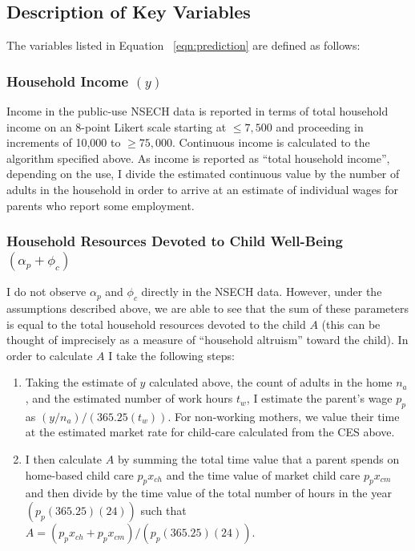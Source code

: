 \documentclass[1p, review]{elsarticle}\usepackage[]{graphicx}\usepackage[]{color}
\begin{document}
\subsection{Description of Key Variables}










The variables listed in Equation ~\ref{eqn:prediction} are defined as follows:

\subsubsection{Household Income $(y)$}

Income in the public-use NSECH data is reported in terms of total household income on an 8-point Likert scale starting at $\le 7,500$ and proceeding in increments of 10,000 to $\ge 75,000$. Continuous income is calculated to the algorithm specified above. As income is reported as ``total household income'', depending on the use, I divide the estimated continuous value by the number of adults in the household in order to arrive at an estimate of individual wages for parents who report some employment.    

\subsubsection{Household Resources Devoted to Child Well-Being $(\alpha_p + \phi_c)$}

I do not observe $\alpha_p$ and $\phi_c$ directly in the NSECH data. However, under the assumptions described above, we are able to see that the sum of these parameters is equal to the total household resources devoted to the child $A$ (this can be thought of imprecisely as a measure of ``household altruism'' toward the child). In order to calculate $A$ I take the following steps: 

\begin{enumerate}
  \item Taking the estimate of $y$ calculated above, the count of adults in the home $n_a$, and the estimated number of work hours $t_w$, I estimate the parent's wage $p_p$ as $(y/n_a)/(365.25(t_w))$. For non-working mothers, we value their time at the estimated market rate for child-care calculated from the CES above.   
  \item I then calculate $A$ by summing the total time value that a parent spends on home-based child care $p_px_{ch}$ and the time value of market child care $p_px_{cm}$ and then divide by the time value of the total number of hours in the year $(p_p(365.25)(24))$ such that $A=(p_px_{ch}+p_px_{cm})/(p_p(365.25)(24))$.
\end{enumerate}
\end{document}
